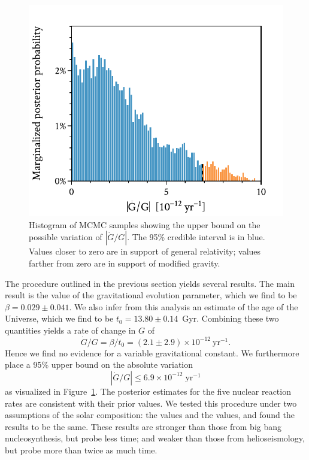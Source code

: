 \documentclass[twocolumn]{aastex63}
\newif\ifref
\newcommand{\mb}[1]{\ifref\textcolor{darkred}{#1}\else #1\fi}
\begin{document}
\begin{figure}
    \centering
    \includegraphics[width=\linewidth, trim={0 0 0 0.5cm}, clip]{beta_posterior.pdf}
    \caption{\mb{Histogram of MCMC samples showing} the upper bound on the possible variation of $|\dot G/G|$. The 95\% credible interval is in blue. Values closer to zero are in support of general relativity; values farther from zero are in support of modified gravity. 
    \label{fig:upper-bound}} 
\end{figure}

The procedure outlined in the previous section yields several results. 
The main result is the value of the gravitational evolution parameter, which we find to be ${\beta = 0.029 \pm 0.041}$. 
We also infer from this analysis an estimate of the age of the Universe, which we find to be ${t_0 = 13.80 \pm 0.14}$~Gyr. 
Combining these two quantities yields a rate of change in $G$ of 
\begin{equation}
    \dot{G}/G = \beta/t_0 = (2.1 \pm 2.9) \times 10^{-12}~\text{yr}^{-1}.
\end{equation}
Hence we find no evidence for a variable gravitational constant. 
We furthermore place a 95\% upper bound on the absolute variation 
\begin{equation}
    |\dot{G}/G| \leq 6.9 \times 10^{-12}\;\text{yr}^{-1}
\end{equation}
as visualized in Figure~\ref{fig:upper-bound}. 
The posterior estimates for the five nuclear reaction rates are consistent with their prior values. 
We tested this procedure under two assumptions of the solar composition: the \citet[][``GS98'']{1998SSRv...85..161G} values and the \citet[][``AGSS09'']{2009ARA&A..47..481A} values, and found the results to be the same. 
\mb{These results are stronger than those from big bang nucleosynthesis, but probe less time; and weaker than those from helioseismology, but probe more than twice as much time.} 
\end{document}

